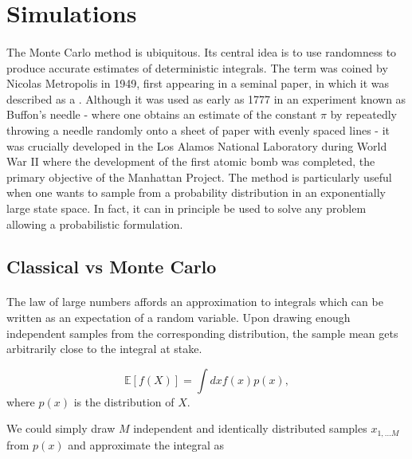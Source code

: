 \documentclass[10pt, twocolumn, twoside]{article}
\begin{document}
\section{Simulations}\label{hubbQMC}\paragraph{}

The Monte Carlo method is ubiquitous. Its central idea is to use randomness to produce accurate estimates of deterministic integrals. The term was coined by Nicolas Metropolis in 1949, first appearing in a seminal paper, in which it was described as a \cite{metropolis}. Although it was used as early as 1777 in an experiment known as Buffon's needle - where one obtains an estimate of the constant $\pi$ by repeatedly throwing  a needle randomly onto a sheet of paper with evenly spaced lines - it was crucially developed in the Los Alamos National Laboratory during World War II where the development of the first atomic bomb was completed, the primary objective of the Manhattan Project. The method is particularly useful when one wants to sample from a probability distribution in an exponentially large state space. In fact, it can in principle be used to solve any problem allowing a probabilistic formulation.

\subsection{Classical vs Monte Carlo}\paragraph{}

The law of large numbers affords an approximation to integrals which can be written as an expectation of a random variable. Upon drawing enough independent samples from the corresponding distribution, the sample mean gets arbitrarily close to the integral at stake.

\begin{equation}\label{eq:int_mean}
\mathbb{E} [f(X)] = \int dx f(x) p(x),
\end{equation}
where $p(x)$ is the distribution of $X$. 

We could simply draw $M$ independent and identically distributed samples $x_{1,...M}$ from $p(x)$ and approximate the integral as
\end{document}
